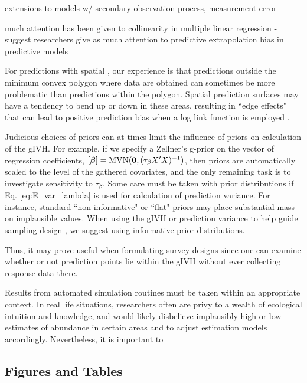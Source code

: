 \documentclass[fleqn,10pt]{wlpeerj}
\begin{document}
extensions to models w/ secondary observation process, measurement error

much attention has been given to collinearity in multiple linear regression - suggest researchers give as much attention to predictive extrapolation bias in predictive models

For predictions with spatial , our experience is that predictions outside the minimum convex polygon where data are obtained can sometimes be more problematic than predictions within the polygon.  Spatial prediction surfaces may have a tendency to bend up or down in these areas, resulting in ``edge effects" that can lead to positive prediction bias when a log link function is employed \citep{VerHoefJansen2007}.






Judicious choices of priors can at times limit the influence of priors on calculation of the gIVH.  For example, if we specify a Zellner's g-prior \citep{Zellner1986} on the vector of regression coefficients, $[\boldsymbol{\beta}] = \textrm{MVN}({\bf 0},(\tau_\beta X^\prime X)^{-1})$, then priors are automatically scaled to the level of the gathered covariates, and the only remaining task is to investigate sensitivity to $\tau_\beta$.
Some care must be taken with prior distributions if Eq. \ref{eq:E_var_lambda} is used for calculation of prediction variance.  For instance, standard ``non-informative" or ``flat" priors may place substantial mass on implausible values.  When using the gIVH or prediction variance to help guide sampling design \citep[see][for an example using prediction variance]{DiggleLophaven2006}, we suggest using informative prior distributions.

Thus, it may prove useful when formulating survey designs since one can examine whether or not prediction points lie within the gIVH without ever collecting response data there.



Results from automated simulation routines must be taken within an appropriate context.  In real life situations, researchers often are privy to a wealth of ecological intuition and knowledge, and would likely disbelieve implausibly high or low estimates of abundance in certain areas and to adjust estimation models accordingly.  Nevertheless, it is important to



\subsection*{Figures and Tables}
\end{document}
